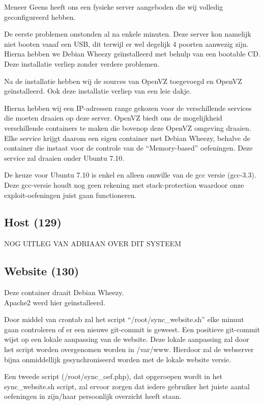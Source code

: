 Meneer Geens heeft ons een fysieke server aangeboden die wij volledig geconfigureerd hebben.

De eerste problemen onstonden al na enkele minuten. Deze server kon namelijk niet booten vanaf een USB, dit terwijl er wel degelijk 4 poorten aanwezig zijn. Hierna hebben we Debian Wheezy\cite{wheezy} ge\"installeerd met behulp van een bootable CD. Deze installatie verliep zonder verdere problemen.

Na de installatie hebben wij de sources van OpenVZ\cite{openvz} toegevoegd en OpenVZ ge\"installeerd.
Ook deze installatie verliep van een leie dakje.

Hierna hebben wij een IP-adressen range gekozen voor de verschillende services die moeten draaien op deze server. OpenVZ biedt ons de mogelijkheid verschillende containers\cite{openvzcontainers} te maken die bovenop deze OpenVZ omgeving draaien. Elke service krijgt daarom een eigen container met Debian Wheezy, behalve de container die instaat voor de controle van de ``Memory-based'' oefeningen. Deze service zal draaien onder Ubuntu 7.10\cite{openvzubuntu}.

De keuze voor Ubuntu 7.10 is enkel en alleen omwille van de gcc\cite{gcc} versie (gcc-3.3). Deze gcc-versie houdt nog geen rekening met stack-protection waardoor onze exploit-oefeningen juist gaan functioneren.

\subsection{Host (129)}
NOG UITLEG VAN ADRIAAN OVER DIT SYSTEEM

\subsection{Website (130)}
Deze container draait Debian Wheezy.\\
Apache2\cite{apache} werd hier geïnstalleerd.

Door middel van crontab zal het script ``/root/sync\_website.sh'' elke minuut gaan controleren of er een nieuwe git-commit is geweest. Een positieve git-commit wijst op een lokale aanpassing van de website. Deze lokale aanpassing zal door het script worden overgenomen worden in /var/www. Hierdoor zal de webserver bijna onmiddellijk gesynchroniseerd worden met de lokale website versie.

Een tweede script (/root/sync\_oef.php), dat opgeroepen wordt in het sync\_website.sh script, zal ervoor zorgen dat iedere gebruiker het juiste aantal oefeningen in zijn/haar persoonlijk overzicht heeft staan.

